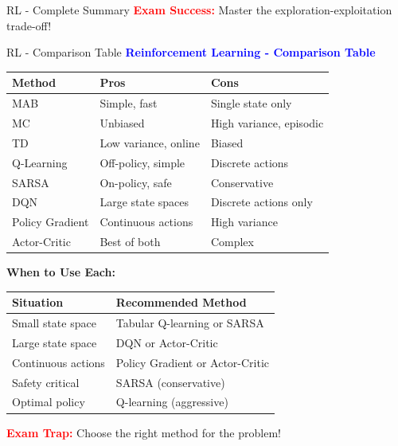 \documentclass[8pt]{beamer}
\begin{document}
\begin{frame}{RL - Complete Summary}
\textcolor{red}{\textbf{Exam Success:}} Master the exploration-exploitation trade-off!
\end{frame}

\begin{frame}{RL - Comparison Table}
\fontsize{6.5}{7.5}\selectfont
\textcolor{blue}{\textbf{Reinforcement Learning - Comparison Table}}

\begin{tabular}{|p{3cm}|p{3cm}|p{3cm}|}
\hline
\textbf{Method} & \textbf{Pros} & \textbf{Cons} \\
\hline
MAB & Simple, fast & Single state only \\
\hline
MC & Unbiased & High variance, episodic \\
\hline
TD & Low variance, online & Biased \\
\hline
Q-Learning & Off-policy, simple & Discrete actions \\
\hline
SARSA & On-policy, safe & Conservative \\
\hline
DQN & Large state spaces & Discrete actions only \\
\hline
Policy Gradient & Continuous actions & High variance \\
\hline
Actor-Critic & Best of both & Complex \\
\hline
\end{tabular}

\textbf{When to Use Each:}

\begin{tabular}{|p{3cm}|p{5cm}|}
\hline
\textbf{Situation} & \textbf{Recommended Method} \\
\hline
Small state space & Tabular Q-learning or SARSA \\
\hline
Large state space & DQN or Actor-Critic \\
\hline
Continuous actions & Policy Gradient or Actor-Critic \\
\hline
Safety critical & SARSA (conservative) \\
\hline
Optimal policy & Q-learning (aggressive) \\
\hline
\end{tabular}

\textcolor{red}{\textbf{Exam Trap:}} Choose the right method for the problem!
\end{frame}
\end{document}
